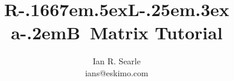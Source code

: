 
\setlength{\parindent}{0in}
\setlength{\textwidth}{6.25in}
\setlength{\oddsidemargin}{0.35in}
\setlength{\evensidemargin}{0in}
\setlength{\parskip}{0.1in}
\setcounter{secnumdepth}{3}
\setcounter{tocdepth}{3}
\newcommand{\defeq}{\stackrel{\triangle}{=}}
\newcommand{\rvec}[4]{{}^{#2}\vec{#1}^{#3}_{#4}}
\newcommand{\bvec}[4]{{}^{#2}{\mbox{\boldmath $#1$}}{}^{#3}_{#4}}
\newcommand{\dbvec}[4]{{}^{#2}\dot{\mbox{\boldmath $#1$}}{}^{#3}_{#4}}
\newcommand{\ddbvec}[4]{{}^{#2}\ddot{\mbox{\boldmath $#1$}}{}^{#3}_{#4}}

\def\RLaB{{\rm R\kern-.1667em\lower.5ex\hbox{L}\kern-.25em\raise.3ex
    \hbox{\sc a}\kern-.2emB}}
\title{\RLaB\ Matrix Tutorial}
\author{Ian R. Searle \\ ians@eskimo.com}
\date{}


\maketitle


